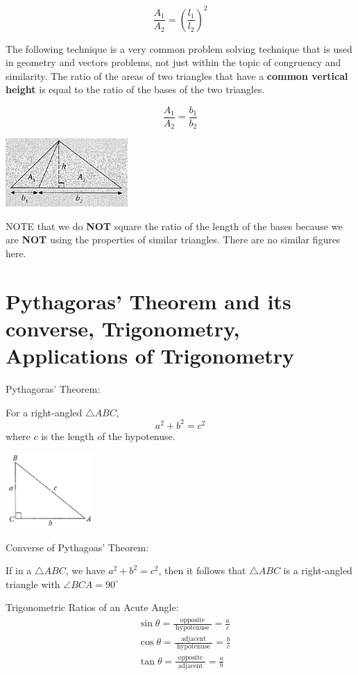 \documentclass[twocolumn]{article}
\begin{document}
$$\frac{A_1}{A_2}=\left(\frac{l_1}{l_2}\right)^2$$

\bigskip 

\noindent 
The following technique is a very common problem solving technique that is used in geometry and vectors problems, not just within the topic of congruency and similarity. The ratio of the areas of two triangles that have a {\bf common vertical height} is equal to the ratio of the bases of the two triangles.

$$\frac{A_1}{A_2}=\frac{b_1}{b_2}$$

\includegraphics[width=0.35\textwidth]{99.png}

\noindent 

NOTE that we do {\bf NOT} square the ratio of the length of the bases because we are {\bf NOT} using the properties of similar triangles. There are no similar figures here.

\section*{Pythagoras' Theorem and its converse, Trigonometry, Applications of Trigonometry}

\noindent 
Pythagoras' Theorem:

\noindent 
For a right-angled $\triangle A B C$,
$$
a^2+b^2=c^2
$$
where $c$ is the length of the hypotenuse.

\includegraphics[width=0.25\textwidth]{100.png}

\bigskip 

\noindent 
Converse of Pythagoas' Theorem:

\noindent 
If in a  $\triangle A B C$, we have  $a^2+b^2=c^2$,
then it follows that $\triangle A B C$ is a right-angled triangle with $\angle BCA = 90^{\circ}$

\bigskip 

\noindent 
Trigonometric Ratios of an Acute Angle:
$$
\begin{aligned}
	& \sin \theta=\frac{\text { opposite }}{\text { hypotenuse }}=\frac{a}{c} \\
	& \cos \theta=\frac{\text { adjacent }}{\text { hypotenuse }}=\frac{b}{c} \\
	& \tan \theta=\frac{\text { opposite }}{\text { adjacent }}=\frac{a}{b}
\end{aligned}
$$
\end{document}
